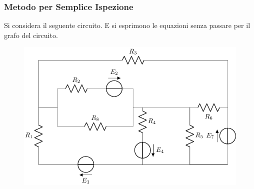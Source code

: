 \documentclass{article}
\numberwithin{equation}{subsection}
\begin{document}
\subsubsection{Metodo per Semplice Ispezione}
Si considera il seguente circuito. E si esprimono le equazioni senza passare per il grafo del circuito.
\begin{figure}[H]%
    \centering
    \includegraphics{circuito-4.pdf}
    \label{fig:circuito-4}
\end{figure}
\end{document}
